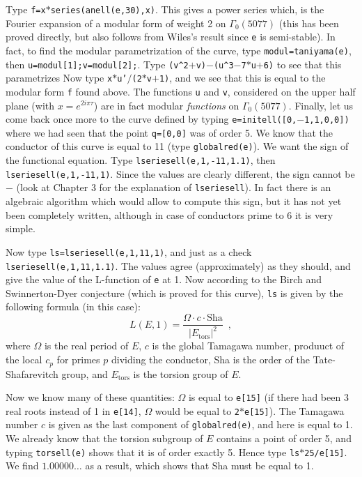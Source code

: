 Type {\tt f=x$*$series(anell(e,30),x)}. This gives a power series which,
is the Fourier expansion of a modular form of weight 2 on $\Gamma_0(5077)$
(this has been proved directly, but also follows from Wiles's result since
{\tt e} is semi-stable). In fact, to find the modular parametrization of
the curve, type {\tt modul=taniyama(e)}, then {\tt u=modul[1];v=modul[2];}.
Type {\tt (v\^{}2$+$v)$-$(u\^{}3$-$7$*$u$+$6)} to see that this parametrizes
Now type {\tt x$*$u'$/$(2$*$v$+$1)}, and we see that this is equal to the
modular form {\tt f} found above. The functions {\tt u} and {\tt v}, considered
on the upper half plane (with $x=e^{2i\pi\tau}$) are in fact modular 
{\it functions} on $\Gamma_0(5077)$.
\smallskip
Finally, let us come back once more to the curve defined by typing
{\tt e=initell([0,$-$1,1,0,0])} where we had seen that the point {\tt q=[0,0]}
was of order 5. We know that the conductor of this curve is equal to 11
(type {\tt globalred(e)}). We want the sign of the functional equation.
Type {\tt lseriesell(e,1,-11,1.1)}, then {\tt lseriesell(e,1,-11,1)}. Since
the values are clearly different, the sign cannot be $-$ (look at Chapter 3
for the explanation of {\tt lseriesell}). In fact there is an algebraic 
algorithm which would allow to compute this sign, but it has not yet been
completely written, although in case of conductors prime to 6 it is very
simple.

Now type {\tt ls=lseriesell(e,1,11,1)}, and just as a check
{\tt lseriesell(e,1,11,1.1)}. The values agree (approximately) as they should,
and give the value of the L-function of {\tt e} at 1. Now according to
the Birch and Swinnerton-Dyer conjecture (which is proved for this curve),
{\tt ls} is given by the following formula (in this case):
$$L(E,1)=\dfrac{\Omega\cdot c\cdot\text{Sha}}{|E_{\text{tors}}|^2}\enspace,$$
where $\Omega$ is the real period of $E$, $c$ is the global Tamagawa number,
produuct of the local $c_p$ for primes $p$ dividing the conductor, Sha is the
order of the Tate-Shafarevitch group, and $E_{\text{tors}}$ is the torsion
group of $E$.

Now we know many of these quantities: $\Omega$ is equal to {\tt e[15]}
(if there had been 3 real roots instead of 1 in {\tt e[14]}, $\Omega$ would
be equal to {\tt 2$*$e[15]}). The Tamagawa number $c$ is given as the last
component of {\tt globalred(e)}, and here is equal to 1. We already know
that the torsion subgroup of $E$ contains a point of order 5, and 
typing {\tt torsell(e)} shows that it is of order exactly 5. Hence type 
{\tt ls$*$25/e[15]}. We find $1.00000\dots$ as a result, which shows that 
Sha must be equal to 1.
\medskip
